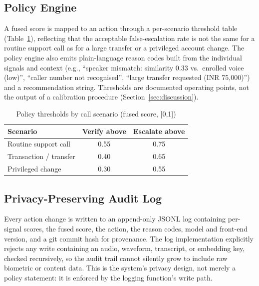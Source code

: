 \documentclass[conference]{IEEEtran}
\begin{document}
\subsection{Policy Engine}
\label{sec:policy}
A fused score is mapped to an action through a per-scenario threshold
table (Table~\ref{tab:policy}), reflecting that the acceptable
false-escalation rate is not the same for a routine support call as for
a large transfer or a privileged account change. The policy engine also
emits plain-language reason codes built from the individual signals and
context (e.g., ``speaker mismatch: similarity 0.33 vs.\ enrolled voice
(low)'', ``caller number not recognised'', ``large transfer requested
(INR 75{,}000)'') and a recommendation string. Thresholds are documented
operating points, not the output of a calibration procedure
(Section~\ref{sec:discussion}).

\begin{table}[t]
\centering
\caption{Policy thresholds by call scenario (fused score, [0,1])}
\label{tab:policy}
\begin{tabular}{@{}lcc@{}}
\toprule
Scenario & Verify above & Escalate above \\
\midrule
Routine support call    & 0.55 & 0.75 \\
Transaction / transfer  & 0.40 & 0.65 \\
Privileged change       & 0.30 & 0.55 \\
\bottomrule
\end{tabular}
\end{table}

\subsection{Privacy-Preserving Audit Log}
Every action change is written to an append-only JSONL log containing
per-signal scores, the fused score, the action, the reason codes, model
and front-end version, and a git commit hash for provenance. The log
implementation explicitly rejects any write containing an audio,
waveform, transcript, or embedding key, checked recursively, so the
audit trail cannot silently grow to include raw biometric or content
data. This is the system's privacy design, not merely a policy
statement: it is enforced by the logging function's write path.
\end{document}
